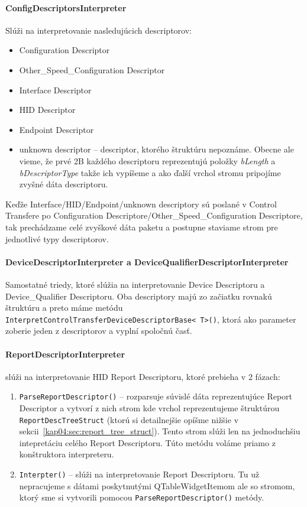 \paragraph{ConfigDescriptorsInterpreter}
\hfill \break
Slúži na interpretovanie nasledujúcich descriptorov:
\begin{itemize}
\item Configuration Descriptor
\item Other\_Speed\_Configuration Descriptor
\item Interface Descriptor
\item HID Descriptor
\item Endpoint Descriptor
\item unknown descriptor -- descriptor, ktorého štruktúru nepoznáme. Obecne ale vieme, že prvé 2B každého descriptoru reprezentujú položky \textit{bLength} a \textit{bDescriptorType} takže ich vypíšeme a ako ďalší vrchol stromu pripojíme zvyšné dáta descriptoru.
\end{itemize}
Keďže Interface/HID/Endpoint/unknown descriptory sú poslané v Control Tran\-sfere po Configuration Descriptore/Other\_Speed\_Configuration Descriptore, tak prechádzame celé zvyškové dáta paketu a postupne staviame strom pre jednotlivé typy descriptorov.

\paragraph{DeviceDescriptorInterpreter a DeviceQualifierDescriptorInterpreter}
\hfill \break
Samostatné triedy, ktoré slúžia na interpretovanie Device Descriptoru a \newline Device\_Qualifier Descriptoru. Oba descriptory majú zo začiatku rovnakú štruktúru a preto máme metódu \newline \texttt{InterpretControlTransferDeviceDescriptorBase\textless~T\textgreater()}, ktorá ako parameter zoberie jeden z descriptorov a vyplní spoločnú časť.

\paragraph{ReportDescriptorInterpreter} slúži na interpretovanie HID Report Descriptoru, ktoré prebieha v 2 fázach:
\begin{enumerate}
\item \texttt{ParseReportDescriptor()} -- rozparsuje súvislé dáta reprezentujúce Report Descriptor a vytvorí z nich strom kde vrchol reprezentujeme štruktúrou \texttt{ReportDescTreeStruct} (ktorú si detailnejšie opíšme nižšie v sekcii~\ref{kap04:sec:report_tree_struct}). Tento strom slúži len na jednoduchšiu intepretáciu celého Report Descriptoru. Túto metódu voláme priamo z konštruktora interpreteru.
\item \texttt{Interpter()} -- slúži na interpretovanie Report Descriptoru. Tu už nepracujeme s dátami poskytnutými QTableWidgetItemom ale so stromom, ktorý sme si vytvorili pomocou \texttt{ParseReportDescriptor()} metódy.
\end{enumerate}

